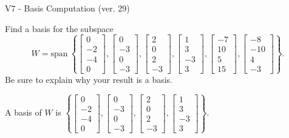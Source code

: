\begin{exercise}
  \begin{exerciseTitle}V7 - Basis Computation (ver. 29)\end{exerciseTitle}
  \begin{exerciseStatement}
    Find a basis for the subspace 
\[W=\mathrm{span}\ \left\{\left[\begin{array}{r}
0 \\
-2 \\
-4 \\
0
\end{array}\right] , \left[\begin{array}{r}
0 \\
-3 \\
0 \\
-3
\end{array}\right] , \left[\begin{array}{r}
2 \\
0 \\
2 \\
-3
\end{array}\right] , \left[\begin{array}{r}
1 \\
3 \\
-3 \\
3
\end{array}\right] , \left[\begin{array}{r}
-7 \\
10 \\
5 \\
15
\end{array}\right] , \left[\begin{array}{r}
-8 \\
-10 \\
4 \\
-3
\end{array}\right]\right\}.\]
 Be sure to explain why your result is a basis.


  \end{exerciseStatement}
  \begin{exerciseAnswer}
   A basis of \(W\) is  \(\left\{\left[\begin{array}{r}
0 \\
-2 \\
-4 \\
0
\end{array}\right] , \left[\begin{array}{r}
0 \\
-3 \\
0 \\
-3
\end{array}\right] , \left[\begin{array}{r}
2 \\
0 \\
2 \\
-3
\end{array}\right] , \left[\begin{array}{r}
1 \\
3 \\
-3 \\
3
\end{array}\right]\right\}\).
  


  \end{exerciseAnswer}
\end{exercise}